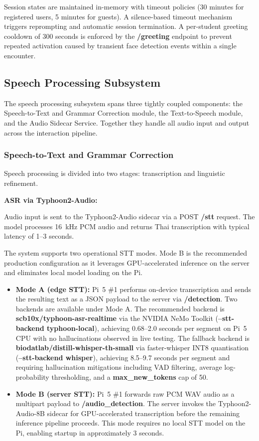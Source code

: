 Session states are maintained in-memory with timeout policies (30 minutes for registered users, 5 minutes for guests). A silence-based timeout mechanism triggers reprompting and automatic session termination. A per-student greeting cooldown of 300 seconds is enforced by the \textbf{/greeting} endpoint to prevent repeated activation caused by transient face detection events within a single encounter.

\subsection{Speech Processing Subsystem}

The speech processing subsystem spans three tightly coupled components: the Speech-to-Text and Grammar Correction module, the Text-to-Speech module, and the Audio Sidecar Service. Together they handle all audio input and output across the interaction pipeline.

\subsubsection{Speech-to-Text and Grammar Correction}

Speech processing is divided into two stages: transcription and linguistic refinement.


\textbf{ASR via Typhoon2-Audio:} 

\indent Audio input is sent to the Typhoon2-Audio sidecar via a POST \textbf{/stt} request. The model processes 16~kHz PCM audio and returns Thai transcription with typical latency of 1--3 seconds.

\indent The system supports two operational STT modes. Mode B is the recommended production configuration as it leverages GPU-accelerated inference on the server and eliminates local model loading on the Pi.



\begin{itemize}
    \item \textbf{Mode A (edge STT):} Pi~5 \#1 performs on-device transcription and sends the resulting text as a JSON payload to the server via \textbf{/detection}. Two backends are available under Mode A. The recommended backend is \textbf{scb10x/typhoon-asr-realtime} via the NVIDIA NeMo Toolkit (\textbf{--stt-backend typhoon-local}), achieving 0.68--2.0 seconds per segment on Pi~5 CPU with no hallucinations observed in live testing. The fallback backend is \textbf{biodatlab/distill-whisper-th-small} via faster-whisper INT8 quantisation (\textbf{--stt-backend whisper}), achieving 8.5--9.7 seconds per segment and requiring hallucination mitigations including VAD filtering, average log-probability thresholding, and a \textbf{max\_new\_tokens} cap of 50.

    \item \textbf{Mode B (server STT):} Pi~5 \#1 forwards raw PCM WAV audio as a multipart payload to \textbf{/audio\_detection}. The server invokes the Typhoon2-Audio-8B sidecar for GPU-accelerated transcription before the remaining inference pipeline proceeds. This mode requires no local STT model on the Pi, enabling startup in approximately 3 seconds.
\end{itemize}


